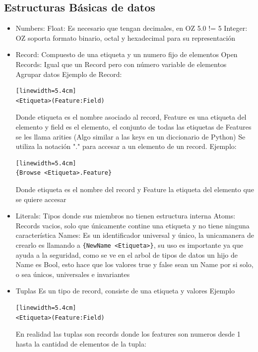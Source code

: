 \documentclass[10pt,journal,compsoc]{IEEEtran}
\begin{document}
\subsection{Estructuras B\'asicas de datos}
\begin{itemize}
	\item Numbers:
		\subitem Float: Es necesario que tengan decimales, en OZ 5.0 != 5
		\subitem Integer: OZ soporta formato binario, octal y hexadecimal para su representaci\'on
	\item Record: Compuesto de una etiqueta y un numero fijo de elementos
		\subitem Open Records: Igual que un Record pero con n\'umero variable de elementos 
		\subitem Agrupar datos
		\subitem Ejemplo de Record:
\begin{lstlisting}[language=Oz, caption = {Record}][linewidth=5.4cm]
<Etiqueta>(Feature:Field)
\end{lstlisting}
		Donde etiqueta es el nombre asociado al record, Feature es una etiqueta del elemento y field es el elemento, el conjunto de todas las etiquetas de Features se les llama arities (Algo similar a las keys en un diccionario de Python) 
		\subitem Se utiliza la notaci\'on "." para accesar a un elemento de un record. Ejemplo:
\begin{lstlisting}[language=Oz, caption = {Accesar al elemento de un Record}][linewidth=5.4cm]
{Browse <Etiqueta>.Feature}
\end{lstlisting}
		Donde etiqueta es el nombre del record y Feature la etiqueta del elemento que se quiere accesar
	\item Literals: Tipos donde sus miembros no tienen estructura interna
		\subitem *Atoms: Records vacios, solo que \'unicamente contine una etiqueta y no tiene ninguna caracter\'istica
		\subitem *Names: Es un identificador universal y \'unico, la unicamanera de crearlo es llamando a \verb|{NewName <Etiqueta>}|, su uso es importante ya que ayuda a la seguridad, como se ve en el arbol de tipos de datos un hijo de Name es Bool, esto hace que los valores true y false sean un Name por si solo, o sea \'unicos, universales e invariantes
	\item Tuplas
		\subitem Es un tipo de record, consiste de una etiqueta y valores
		\subitem Ejemplo
\begin{lstlisting}[language=Oz, caption = {Tupla}][linewidth=5.4cm]
<Etiqueta>(Feature:Field)
\end{lstlisting}
		\subitem En realidad las tuplas son records donde los features son numeros desde 1 hasta la cantidad de elementos de la tupla:

\end{itemize}
\end{document}
